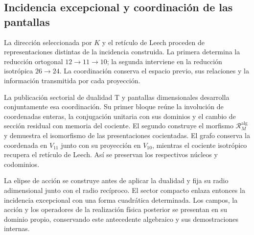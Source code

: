 \subsection{Incidencia excepcional y coordinación de las pantallas}
\label{exc:pantallas-dualidad}

La dirección seleccionada por \(K\) y el retículo de Leech proceden
de representaciones distintas de la incidencia construida. La primera
determina la reducción ortogonal \(12\to11\to10\); la segunda
interviene en la reducción isotrópica \(26\to24\). La coordinación
conserva el espacio previo, sus relaciones y la información transmitida
por cada proyección.

La publicación sectorial de dualidad T y pantallas dimensionales desarrolla
conjuntamente esa coordinación. Su primer bloque reúne la involución de
coordenadas enteras, la conjugación unitaria con sus dominios y el
cambio de sección residual con memoria del cociente. El segundo
construye el morfismo \(\mathcal R_M^{\mathrm{alg}}\) y demuestra el
isomorfismo de las presentaciones cocientadas.
El grafo conserva la coordenada en \(V_{11}\) junto con su proyección
en \(V_{10}\), mientras el cociente isotrópico recupera el retículo
de Leech. Así se preservan los respectivos núcleos y codominios.

La elipse de acción se construye antes de aplicar la dualidad y fija
su radio adimensional junto con el radio recíproco. El sector compacto enlaza entonces
la incidencia excepcional con una forma cuadrática determinada. Los
campos, la acción y los operadores de la realización física posterior
se presentan en su dominio propio, conservando este antecedente
algebraico y sus demostraciones internas.

